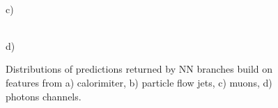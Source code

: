 \documentclass[a4paper]{jpconf}
\begin{document}
\begin{figure}[H]
\begin{minipage}[h!]{0.47\linewidth}
\end{minipage}
\vfill
\begin{minipage}[h!]{0.47\linewidth}
\\ c) 
\end{minipage}
\hfill
\begin{minipage}[h!]{0.47\linewidth}
 \\ d) 
\end{minipage}
\caption{Distributions of predictions returned by NN branches build on features from a) calorimiter, b) particle flow jets, c) muons, d) photons
channels.}
\label{ris:experimentalcorrelationsignals}
\end{figure}
\end{document}
